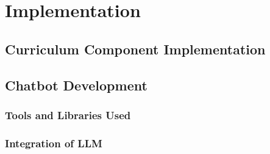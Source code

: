 \chapter{Implementation}

\section{Curriculum Component Implementation}

\section{Chatbot Development}
    \subsection{Tools and Libraries Used}

    \subsection{Integration of LLM}
